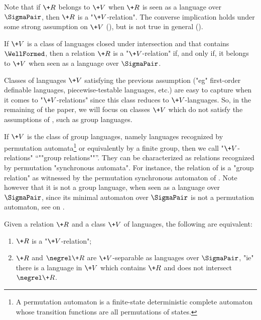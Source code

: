 Note that if $\+R$ belongs to $\+V$ when $\+R$ is seen as a language over $\SigmaPair$,
then $\+R$ is a "$\+V$-relation".
The converse implication holds under some strong assumption on $\+V$ (),
but is not true in general ().

\begin{fact}
	\AP\label{fact:a-triviality-on-trivial-relations}
	If $\+V$ is a class of languages closed under intersection and that contains $\WellFormed$, then
	a relation $\+R$ is a "$\+V$-relation" if, and only if, it belongs to $\+V$ when seen
	as a language over $\SigmaPair$.
\end{fact}

Classes of languages $\+V$ satisfying the previous assumption ("eg" first-order definable languages, piecewise-testable languages, etc.) are easy to capture when
it comes to "$\+V$-relations" since this class reduces to $\+V$-languages.
So, in the remaining of the paper, we will focus on classes $\+V$ which do not satisfy
the assumptions of , such as group languages.

\begin{example}
	\AP\label{ex:group-languages}
	If $\+V$ is the class
	of group languages, namely languages recognized by permutation automata\footnote{A permutation 
	automaton is a finite-state deterministic complete automaton whose transition functions are all 
	permutations of states.} or equivalently by a finite group, then we call
	"$\+V$-relations" \AP``""group relations""''. They can be characterized 
	as relations recognized by permutation "synchronous automata". For instance, the relation
	of  is a "group relation" as witnessed by the permutation synchronous automaton of . Note however that it is not a group language, when seen as a language over $\SigmaPair$, since its minimal automaton over $\SigmaPair$ is not
	a permutation automaton, see  on .
\end{example}

\begin{fact}
	\AP\label{fact:separability}
	Given a relation $\+R$ and a class $\+V$ of languages, the following are equivalent:
	\begin{enumerate}
		\item $\+R$ is a "$\+V$-relation";
		\item $\+R$ and $\negrel \+R$ are $\+V$-separable as languages over $\SigmaPair$,
		"ie" there is a language in $\+V$ which contains $\+R$ and does not intersect $\negrel \+R$.
	\end{enumerate}
\end{fact}

